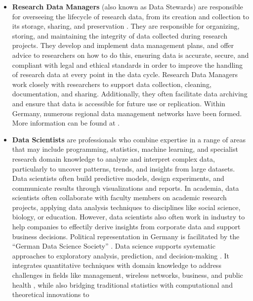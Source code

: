 \documentclass[
        english,biblatex
    ]{lni}
\begin{document}
    \begin{itemize}
    \item
      \textbf{Research Data Managers} (also known as Data Stewards) are
      responsible for overseeing the lifecycle of research data, from
      its creation and collection to its storage, sharing, and
      preservation \autocite{zenodo4915861}. They are responsible for
      organizing, storing, and maintaining the integrity of data
      collected during research projects. They develop and implement
      data management plans, and offer advice to researchers on how to
      do this, ensuring data is accurate, secure, and compliant with
      legal and ethical standards in order to improve the handling of
      research data at every point in the data cycle. Research Data
      Managers work closely with researchers to support data collection,
      cleaning, documentation, and sharing. Additionally, they often
      facilitate data archiving and ensure that data is accessible for
      future use or replication. Within Germany, numerous regional data
      management networks have been formed. More information can be
      found at \autocite{fdminfo}.
    \item
      \textbf{Data Scientists} are professionals who combine expertise
      in a range of areas that may include programming, statistics,
      machine learning, and specialist research domain knowledge to
      analyze and interpret complex data, particularly to uncover
      patterns, trends, and insights from large datasets. Data
      scientists often build predictive models, design experiments, and
      communicate results through visualizations and reports. In
      academia, data scientists often collaborate with faculty members
      on academic research projects, applying data analysis techniques
      to disciplines like social science, biology, or education.
      However, data scientists also often work in industry to help
      companies to effectily derive insights from corporate data and
      support business decisions. Political representation in Germany is
      facilitated by the ``German Data Science Society'' \autocite{gds}.
      Data science supports systematic approaches to exploratory
      analysis, prediction, and decision-making
      \autocite{George2016Big}. It integrates quantitative techniques
      with domain knowledge to address challenges in fields like
      management, wireless networks, business, and public health
      \autocite{George2016Big}, while also bridging traditional
      statistics with computational and theoretical innovations to

\end{itemize}
\end{document}
